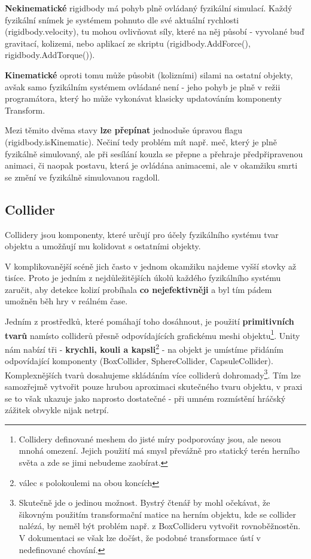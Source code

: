 \textbf{Nekinematické} rigidbody má pohyb plně ovládaný fyzikální simulací. Každý fyzikální snímek je systémem pohnuto dle své aktuální rychlosti (rigidbody.velocity), tu mohou ovlivňovat síly, které na něj působí - vyvolané buď gravitací, kolizemi, nebo aplikací ze skriptu (rigidbody.AddForce(), rigidbody.AddTorque()).

\textbf{Kinematické} oproti tomu může působit (kolizními) silami na ostatní objekty, avšak samo fyzikálním systémem ovládané není - jeho pohyb je plně v režii programátora, který ho může vykonávat klasicky updatováním komponenty Transform.

Mezi těmito dvěma stavy \textbf{lze přepínat} jednoduše úpravou flagu (rigidbody.isKinematic). Nečiní tedy problém mít např. meč, který je plně fyzikálně simulovaný, ale při sesílání kouzla se přepne a přehraje předpřipravenou animaci, či naopak postavu, která je ovládána animacemi, ale v okamžiku smrti se změní ve fyzikálně simulovanou ragdoll.

\subsection{Collider}

Collidery jsou komponenty, které určují pro účely fyzikálního systému tvar objektu a umožňují mu kolidovat s ostatními objekty. 

V komplikovanější scéně jich často v jednom okamžiku najdeme vyšší stovky až tisíce. Proto je jedním z nejdůležitějších úkolů každého fyzikálního systému zaručit, aby detekce kolizí probíhala \textbf{co nejefektivněji} a byl tím pádem umožněn běh hry v reálném čase.

Jedním z prostředků, které pomáhají toho dosáhnout, je použití \textbf{primitivních tvarů} namísto colliderů přesně odpovídajících grafickému meshi objektu\footnote{Collidery definované meshem do jisté míry podporovány jsou, ale nesou mnohá omezení. Jejich použití má smysl převážně pro statický terén herního světa a zde se jimi nebudeme zaobírat.}. Unity nám nabízí tři - \textbf{krychli, kouli a kapsli}\footnote{válec s polokoulemi na obou koncích} - na objekt je umístíme přidáním odpovídající komponenty (BoxCollider, SphereCollider, CapsuleCollider). Komplexnějších tvarů dosahujeme skládáním více colliderů dohromady\footnote{Skutečně jde o jedinou možnost. Bystrý čtenář by mohl očekávat, že šikovným použitím transformační matice na herním objektu, kde se collider nalézá, by neměl být problém např. z BoxCollideru vytvořit rovnoběžnostěn. V dokumentaci se však lze dočíst, že podobné transformace ústí v nedefinované chování.}. Tím lze samozřejmě vytvořit pouze hrubou aproximaci skutečného tvaru objektu, v praxi se to však ukazuje jako naprosto dostatečné - při umném rozmístění hráčský zážitek obvykle nijak netrpí.

